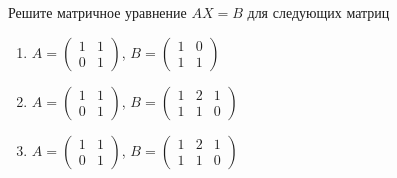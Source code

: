 \begin{exercise}
Решите матричное уравнение \(AX=B\) для следующих матриц
\begin{enumerate}
	\item \(A=\begin{pmatrix}
		1 & 1 \\ 0 & 1
	\end{pmatrix}\), \(B=\begin{pmatrix}
		1 & 0 \\ 1 & 1
	\end{pmatrix}\)
	\item \(A=\begin{pmatrix}
		1 & 1 \\ 0 & 1
	\end{pmatrix}\), \(B=\begin{pmatrix}
		1 & 2 & 1 \\ 1 & 1 & 0
	\end{pmatrix}\)
	\item \(A=\begin{pmatrix}
		1 & 1 \\ 0 & 1
	\end{pmatrix}\), \(B=\begin{pmatrix}
		1 & 2 & 1 \\ 1 & 1 & 0
	\end{pmatrix}\)
\end{enumerate}
\end{exercise}